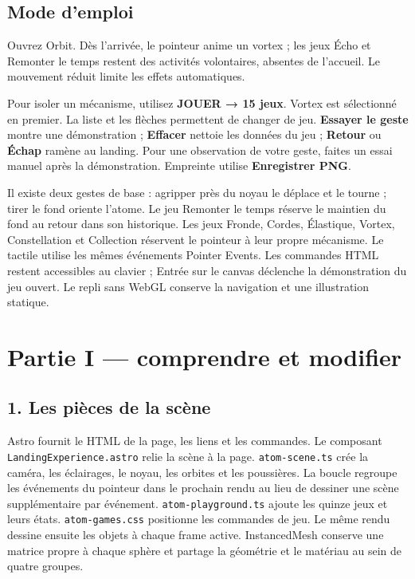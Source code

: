 \documentclass[
  canadien,
  11pt,
  letterpaper,
]{article}
\begin{document}
\subsection{Mode d'emploi}\label{mode-demploi}

Ouvrez Orbit. Dès l'arrivée, le pointeur anime un vortex ; les jeux Écho
et Remonter le temps restent des activités volontaires, absentes de
l'accueil. Le mouvement réduit limite les effets automatiques.

Pour isoler un mécanisme, utilisez \textbf{JOUER → 15 jeux}. Vortex est
sélectionné en premier. La liste et les flèches permettent de changer de
jeu. \textbf{Essayer le geste} montre une démonstration ;
\textbf{Effacer} nettoie les données du jeu ; \textbf{Retour} ou
\textbf{Échap} ramène au landing. Pour une observation de votre geste,
faites un essai manuel après la démonstration. Empreinte utilise
\textbf{Enregistrer PNG}.

Il existe deux gestes de base : agripper près du noyau le déplace et le
tourne ; tirer le fond oriente l'atome. Le jeu Remonter le temps réserve
le maintien du fond au retour dans son historique. Les jeux Fronde,
Cordes, Élastique, Vortex, Constellation et Collection réservent le
pointeur à leur propre mécanisme. Le tactile utilise les mêmes
événements Pointer Events. Les commandes HTML restent accessibles au
clavier ; Entrée sur le canvas déclenche la démonstration du jeu ouvert.
Le repli sans WebGL conserve la navigation et une illustration statique.

\section{Partie I --- comprendre et
modifier}\label{partie-i-comprendre-et-modifier}

\subsection{1. Les pièces de la
scène}\label{les-piuxe8ces-de-la-scuxe8ne}

Astro fournit le HTML de la page, les liens et les commandes. Le
composant \texttt{LandingExperience.astro} relie la scène à la page.
\texttt{atom-scene.ts} crée la caméra, les éclairages, le noyau, les
orbites et les poussières. La boucle regroupe les événements du pointeur
dans le prochain rendu au lieu de dessiner une scène supplémentaire par
événement. \texttt{atom-playground.ts} ajoute les quinze jeux et leurs
états. \texttt{atom-games.css} positionne les commandes de jeu. Le même
rendu dessine ensuite les objets à chaque frame active. InstancedMesh
conserve une matrice propre à chaque sphère et partage la géométrie et
le matériau au sein de quatre groupes.
\end{document}
